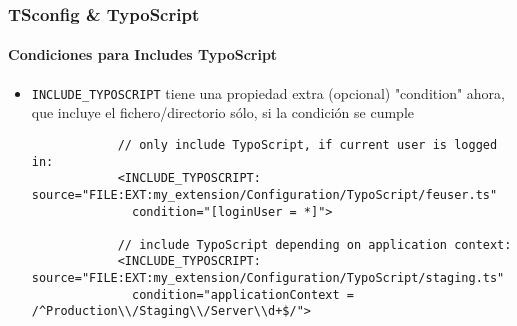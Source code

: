 \begin{frame}[fragile]
	\frametitle{TSconfig \& TypoScript}
	\framesubtitle{Condiciones para Includes TypoScript}

	\lstset{basicstyle=\tiny\ttfamily}

	\begin{itemize}

		\item \texttt{INCLUDE\_TYPOSCRIPT} tiene una propiedad extra (opcional) "condition" ahora, que
			incluye el fichero/directorio sólo, si la condición se cumple

		\begin{lstlisting}
			// only include TypoScript, if current user is logged in:
			<INCLUDE_TYPOSCRIPT: source="FILE:EXT:my_extension/Configuration/TypoScript/feuser.ts"
			  condition="[loginUser = *]">

			// include TypoScript depending on application context:
			<INCLUDE_TYPOSCRIPT: source="FILE:EXT:my_extension/Configuration/TypoScript/staging.ts"
			  condition="applicationContext = /^Production\\/Staging\\/Server\\d+$/">
		\end{lstlisting}

	\end{itemize}

\end{frame}

